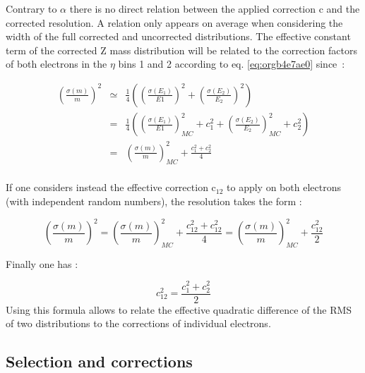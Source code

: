 Contrary to \(\alpha\) there is no direct relation between the applied correction c and the corrected resolution.
A relation only appears on average when considering the width of the full corrected and uncorrected distributions.
The effective constant term of the corrected Z mass distribution will be related to the correction factors of both electrons in the $\eta$ bins 1 and 2 according  to eq. \ref{eq:orgb4e7ae0} since~:

\begin{equation}
\begin{array}{lll}
\left( \frac{\sigma(m)}{m} \right)^2 &\simeq& \frac{1}{4}\left( (\frac{\sigma(E_1)}{E1})^2 + (\frac{\sigma(E_2)}{E_2})^2 \right)\\
& = &\frac{1}{4}\left( (\frac{\sigma(E_1)}{E1})_{MC}^2 + c_1^2 + (\frac{\sigma(E_2)}{E_2})_{MC}^2+ c^2_2 \right)\\
& = &\left( \frac{\sigma(m)}{m} \right)_{MC}^2 + \frac{c_1^2+c_2^2}{4}\\
\end{array}
\end{equation}

If one considers instead the effective correction c\(_{\text{12}}\) to apply on both electrons (with independent random numbers), the resolution takes the form :


\begin{equation}
\left( \frac{\sigma(m)}{m}\right)^2 = \left( \frac{\sigma(m)}{m}\right)_{MC}^2 + \frac{c_{12}^2 + c_{12}^2}{4} = \left( \frac{\sigma(m)}{m}\right)_{MC}^2 + \frac{c_{12}^2}{2}
\end{equation}

Finally one has :

\begin{equation}
\label{eq:orgb4e7ae0}
  c_{12}^2=\frac{c_1^2+c_2^2}{2}
\end{equation}
Using this formula allows to relate the effective quadratic difference of the RMS of two distributions to the corrections of individual electrons.

\subsection{Selection and corrections}
\label{sec:org472930d}

